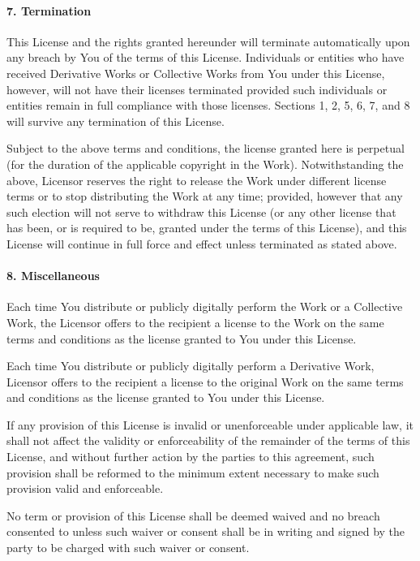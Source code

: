 \paragraph{7. Termination}

This License and the rights granted hereunder will terminate automatically upon any breach by You of the terms of this License. Individuals or entities who have received Derivative Works or Collective Works from You under this License, however, will not have their licenses terminated provided such individuals or entities remain in full compliance with those licenses. Sections 1, 2, 5, 6, 7, and 8 will survive any termination of this License.

Subject to the above terms and conditions, the license granted here is perpetual (for the duration of the applicable copyright in the Work). Notwithstanding the above, Licensor reserves the right to release the Work under different license terms or to stop distributing the Work at any time; provided, however that any such election will not serve to withdraw this License (or any other license that has been, or is required to be, granted under the terms of this License), and this License will continue in full force and effect unless terminated as stated above.

\paragraph{8. Miscellaneous}

    Each time You distribute or publicly digitally perform the Work or a Collective Work, the Licensor offers to the recipient a license to the Work on the same terms and conditions as the license granted to You under this License.

    Each time You distribute or publicly digitally perform a Derivative Work, Licensor offers to the recipient a license to the original Work on the same terms and conditions as the license granted to You under this License.

    If any provision of this License is invalid or unenforceable under applicable law, it shall not affect the validity or enforceability of the remainder of the terms of this License, and without further action by the parties to this agreement, such provision shall be reformed to the minimum extent necessary to make such provision valid and enforceable.

    No term or provision of this License shall be deemed waived and no breach consented to unless such waiver or consent shall be in writing and signed by the party to be charged with such waiver or consent.

